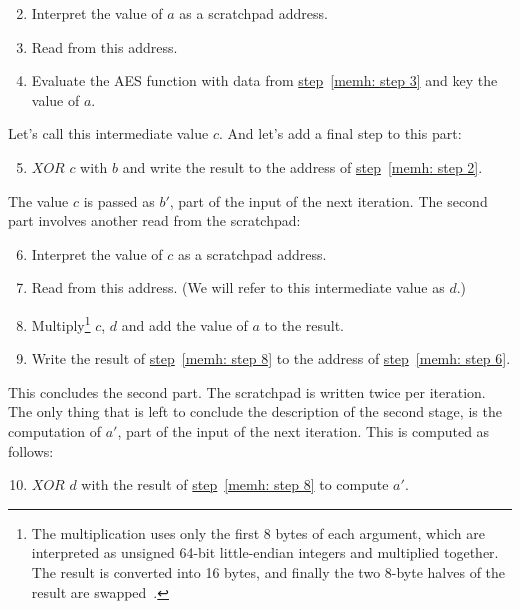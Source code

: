 \begin{enumerate}
  \setcounter{enumi}{1}
  \item \label{memh: step 2} Interpret the value of $a$ as a scratchpad address.
  \item \label{memh: step 3} Read from this address.
  \item Evaluate the AES function with data from \hyperref[memh: step 3]{step}~\ref{memh: step 3} and key the value of $a$.
\end{enumerate}
Let's call this intermediate value $c$. And let's add a final step to this part:
\begin{enumerate}
  \setcounter{enumi}{4}
  \item $XOR$ $c$ with $b$ and write the result to the address of \hyperref[memh: step 2]{step}~\ref{memh: step 2}.
\end{enumerate}
The value $c$ is passed as $b'$, part of the input of the next iteration. The second part involves another read from the scratchpad:

\begin{enumerate}
  \setcounter{enumi}{5}
  \item \label{memh: step 6} Interpret the value of $c$ as a scratchpad address.
  \item Read from this address. (We will refer to this intermediate value as $d$.)
  \item \label{memh: step 8} Multiply\footnote{The multiplication uses only the first 8 bytes of each argument, which are interpreted as unsigned 64-bit little-endian integers and multiplied together. The result is converted into 16 bytes, and finally the two 8-byte halves of the result are swapped~\cite{cryptonight}.} $c$, $d$ and add the value of $a$ to the result.
  \item Write the result of \hyperref[memh: step 8]{step}~\ref{memh: step 8} to the address of \hyperref[memh: step 6]{step}~\ref{memh: step 6}.
\end{enumerate}
This concludes the second part. The scratchpad is written twice per iteration. The only thing that is left to conclude the description of the second stage, is the computation of $a'$, part of the input of the next iteration. This is computed as follows:

\begin{enumerate}
  \setcounter{enumi}{9}
  \item $XOR$ $d$ with the result of \hyperref[memh: step 8]{step}~\ref{memh: step 8} to compute $a'$.
\end{enumerate}

